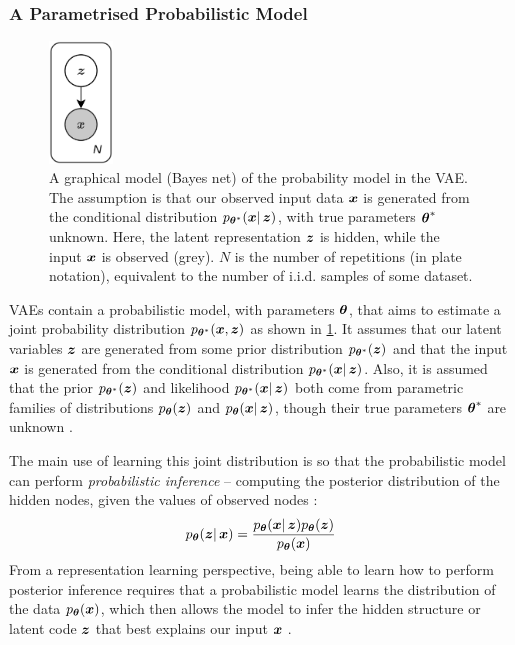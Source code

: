 \subsubsection{A Parametrised Probabilistic Model}
\begin{figure}[H]
    \centering
    \includegraphics[width=0.15\textwidth]{figures/2_/2_general_vae.png}
    \caption{A graphical model (Bayes net) of the probability model in the VAE. The assumption is that our observed input data $\boldsymbol{x}$ is generated from the conditional distribution $p_{\boldsymbol{\theta}^*}(\boldsymbol{x}|\, \boldsymbol{z})$, with true parameters $\boldsymbol{\theta}^*$ unknown. Here, the latent representation $\boldsymbol{z}$ is hidden, while the input $\boldsymbol{x}$ is observed (grey). $N$ is the number of repetitions (in plate notation), equivalent to the number of i.i.d. samples of some dataset.}
    \label{fig:2_general_vae}
\end{figure}
VAEs contain a probabilistic model, with parameters $\boldsymbol{\theta}$, that aims to estimate a joint probability distribution $p_{\boldsymbol{\theta}^*}(\boldsymbol{x}, \boldsymbol{z})$ as shown in \cref{fig:2_general_vae}.  It assumes that our latent variables $\boldsymbol{z}$ are generated from some prior distribution $p_{\boldsymbol{\theta}^*}(\boldsymbol{z})$ and that the input $\boldsymbol{x}$ is generated from the conditional distribution $p_{\boldsymbol{\theta}^*}(\boldsymbol{x}|\, \boldsymbol{z})$. Also, it is assumed that the prior $p_{\boldsymbol{\theta}^*}(\boldsymbol{z})$ and likelihood $p_{\boldsymbol{\theta}^*}(\boldsymbol{x}|\, \boldsymbol{z})$ both come from parametric families of distributions $p_{\boldsymbol{\theta}}(\boldsymbol{z})$ and $p_{\boldsymbol{\theta}}(\boldsymbol{x}|\, \boldsymbol{z})$, though their true parameters $\boldsymbol{\theta}^*$ are unknown \cite{variational_bayes}.

The main use of learning this joint distribution is so that the probabilistic model can perform \textit{probabilistic inference} -- computing the posterior distribution of the hidden nodes, given the values of observed nodes \cite{murphy2012machinelearningBook}:
\begin{equation}
    p_{\boldsymbol{\theta}}(\boldsymbol{z} |\, \boldsymbol{x}) = \frac{p_{\boldsymbol{\theta}}(\boldsymbol{x} |\, \boldsymbol{z}) p_{\boldsymbol{\theta}}(\boldsymbol{z})}{p_{\boldsymbol{\theta}}(\boldsymbol{x})}
\end{equation}
From a representation learning perspective, being able to learn how to perform posterior inference requires that a probabilistic model learns the distribution of the data $p_{\boldsymbol{\theta}}(\boldsymbol{x})$, which then allows the model to infer the hidden structure or latent code $\boldsymbol{z}$ that best explains our input $\boldsymbol{x}$ \cite{stochastic_variational_inference}.

